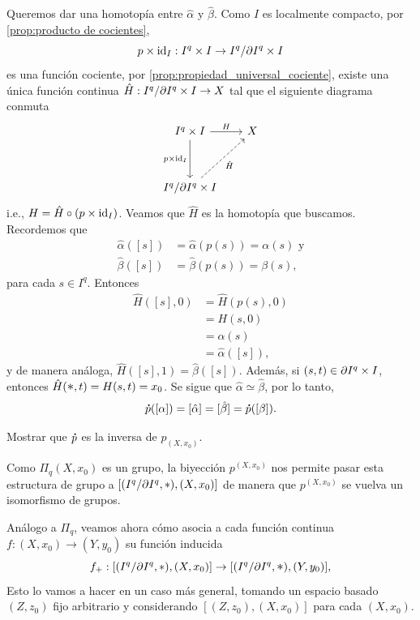 Queremos dar una homotopía entre $\hat{\alpha}$ y $\hat{\beta}.$ Como $I$ es localmente compacto, por \ref{prop:producto de cocientes},
$$p\times \mathrm{id}_I:I^q\times I\to I^q/\partial I^{q}\times I$$ es una función cociente, por \ref{prop:propiedad_universal_cociente}, existe una única función continua $\hat{H}:I^{q}/\partial I^{q}\times I\to X$  tal que el siguiente diagrama conmuta   
\[
\begin{tikzcd}[column sep=0.65cm, row sep=1.2cm] 
        I^q\times I\arrow[r,"H"] \arrow[d,"p\times \id_I"'] & X\\
        I^q/\partial I^q \times I\arrow[ur, dashed, "\hat{H}"']
\end{tikzcd}
\]
i.e., $H=\hat{H}\circ (p\times \mathrm{id}_I)$. Veamos que $\hat{H}$ es la homotopía que buscamos. Recordemos que
\begin{align*}
    \hat{\alpha}([s])&=\hat{\alpha}(p(s))=\alpha(s) \text{ y}\\
    \hat{\beta}([s])&=\hat{\beta}(p(s))=\beta(s),
\end{align*}
para cada $s\in I^q$. Entonces
\begin{equation*}
    \begin{split}
        \hat{H}([s],0)&=\hat{H}(p(s),0)\\
        &=H(s,0)\\
        &=\alpha(s)\\
        &=\hat{\alpha}([s]),
    \end{split}
\end{equation*}
 y de manera análoga, $\hat{H}([s],1)=\hat{\beta}([s])$. Además, si $(s,t)\in \partial I^{q}\times I$, entonces $\hat{H}(\bigast,t)=H(s,t)=x_0$. Se sigue que $\hat{\alpha}\simeq\hat{\beta}$, por lo tanto,
 \[
 \p([\alpha])=[\hat{\alpha}]=[\hat{\beta}]=\p([\beta]).
 \]
\begin{ejercicio}
    Mostrar que $\p$ es la inversa de $p_{(X,x_0)
    }$.
\end{ejercicio}
\begin{obs}
\label{obs:Pi_q cong (Sq,*)}
    Como $\Pi_q(X,x_0)$ es un grupo, la biyección $p^{(X,x_0)}$ nos permite pasar esta estructura de grupo a $[(I^q/\partial I^{q},*),(X,x_0)]$ de manera que $p^{(X,x_0)}$ se vuelva un isomorfismo de grupos.

    Análogo a $\Pi_q$, veamos ahora cómo asocia a cada función continua $f:(X,x_0)\to(Y,y_0)$ su función inducida
    \[
    f_+:\bIq\to[(\Iq/\pIq,\bigast),(Y,y_0)],
    \]
    Esto lo vamos a hacer en un caso más general, tomando un espacio basado $(Z,z_0)$ fijo arbitrario y considerando $[(Z,z_0),(X,x_0)]$ para cada $(X,x_0)$.
\end{obs}
    
